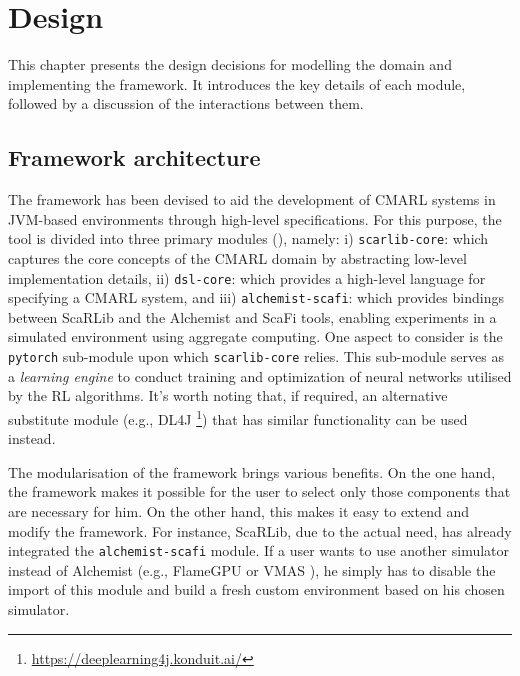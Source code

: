 \documentclass[12pt,a4paper,openright,twoside]{book}
\begin{document}
\chapter{Design} 
\label{chap:design}

This chapter presents the design decisions for modelling the domain and implementing 
    the framework. It introduces the key details of each module, followed by a discussion
    of the interactions between them.

\section{Framework architecture}

The framework has been devised to aid the development of CMARL systems in JVM-based environments through high-level 
    specifications. For this purpose, the tool is divided into three primary modules (), namely:
    i) \texttt{scarlib-core}:  which captures the core concepts of the CMARL domain by abstracting low-level 
        implementation details,
    ii) \texttt{dsl-core}: which provides a high-level language for specifying a CMARL system, and
    iii) \texttt{alchemist-scafi}: which provides bindings between ScaRLib and the Alchemist and ScaFi tools, enabling 
        experiments in a simulated environment using aggregate computing.
    One aspect to consider is the \texttt{pytorch} sub-module upon which \texttt{scarlib-core} relies. This sub-module serves as 
    a \emph{learning engine} to conduct training and optimization of neural networks utilised by the RL algorithms. 
    It's worth noting that, if required, an alternative substitute module (e.g., DL4J \footnote{\url{https://deeplearning4j.konduit.ai/}})
    that has similar functionality can be used instead.

The modularisation of the framework brings various benefits. On the one hand, the framework makes it possible 
    for the user to select only those components that are necessary for him. On the other hand, this makes it 
    easy to extend and modify the framework. For instance, ScaRLib, due to the actual need, has already 
    integrated the \texttt{alchemist-scafi} module. If a user wants to use another simulator instead of Alchemist 
    (e.g., FlameGPU \cite{flame} or VMAS \cite{bettini2022vmas}), he simply has to disable the import of this module and build a fresh 
    custom environment based on his chosen simulator.
\end{document}
